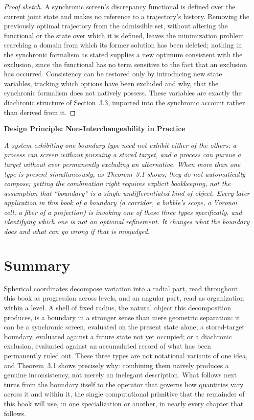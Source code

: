 \documentclass[11pt,fleqn]{book}
\numberwithin{equation}{chapter}
\newenvironment{principle}[1]
  {\begin{principleEnv}
   \noindent\textbf{Design Principle: #1}\par\smallskip\itshape}
  {\end{principleEnv}}
\theoremstyle{plain}
\theoremstyle{definition}
\theoremstyle{remark}
\providecommand{\enquote}[1]{``#1''}
\begin{document}
\begin{proof}[Proof sketch]
A synchronic screen's discrepancy functional is defined over the current joint state and makes no reference to a trajectory's history. Removing the previously optimal trajectory from the admissible set, without altering the functional or the state over which it is defined, leaves the minimization problem searching a domain from which its former solution has been deleted; nothing in the synchronic formalism as stated supplies a new optimum consistent with the exclusion, since the functional has no term sensitive to the fact that an exclusion has occurred. Consistency can be restored only by introducing new state variables, tracking which options have been excluded and why, that the synchronic formalism does not natively possess. These variables are exactly the diachronic structure of Section~3.3, imported into the synchronic account rather than derived from it.
\end{proof}

\begin{principle}{Non-Interchangeability in Practice}
A system exhibiting one boundary type need not exhibit either of the others: a process can screen without pursuing a stored target, and a process can pursue a target without ever permanently excluding an alternative. When more than one type is present simultaneously, as Theorem~3.1 shows, they do not automatically compose; getting the combination right requires explicit bookkeeping, not the assumption that \enquote{boundary} is a single undifferentiated kind of object. Every later application in this book of a boundary (a corridor, a bubble's scope, a Voronoi cell, a fiber of a projection) is invoking one of these three types specifically, and identifying which one is not an optional refinement. It changes what the boundary does and what can go wrong if that is misjudged.
\end{principle}

\section{Summary}

Spherical coordinates decompose variation into a radial part, read throughout this book as progression across levels, and an angular part, read as organization within a level. A shell of fixed radius, the natural object this decomposition produces, is a boundary in a stronger sense than mere geometric separation: it can be a synchronic screen, evaluated on the present state alone; a stored-target boundary, evaluated against a future state not yet occupied; or a diachronic exclusion, evaluated against an accumulated record of what has been permanently ruled out. These three types are not notational variants of one idea, and Theorem~3.1 shows precisely why: combining them naively produces a genuine inconsistency, not merely an inelegant description. What follows next turns from the boundary itself to the operator that governs how quantities vary across it and within it, the single computational primitive that the remainder of this book will use, in one specialization or another, in nearly every chapter that follows.
\end{document}

